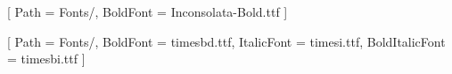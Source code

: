 \usepackage{fontspec}

\setmonofont{Inconsolata-Regular.ttf}[
  Path = Fonts/,
  BoldFont = Inconsolata-Bold.ttf
]

\setmainfont{times.ttf}[
    Path = Fonts/,
    BoldFont = timesbd.ttf,
    ItalicFont = timesi.ttf,
    BoldItalicFont = timesbi.ttf
]